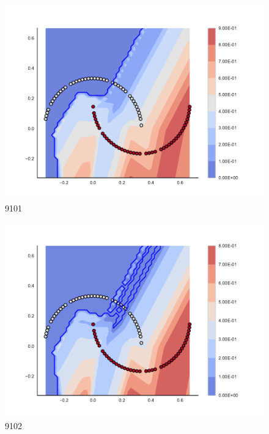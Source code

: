 \begin{subfigure}[b]{0.09\textwidth}
    \includegraphics[clip, trim=2.35cm 1.75cm 4.5cm 0cm,width=\textwidth]{img/convergence/9101.pdf}
    \caption{9101}
    \label{fig:convergence_9101}
\end{subfigure}
%
\begin{subfigure}[b]{0.09\textwidth}
    \includegraphics[clip, trim=2.35cm 1.75cm 4.5cm 0cm,width=\textwidth]{img/convergence/9102.pdf}
    \caption{9102}
    \label{fig:convergence_9102}
\end{subfigure}
%
